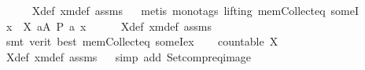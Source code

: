 \begin{isabellebody}
\ \ \ \ \isamarkupfalse%
\ X{\isacharunderscore}{\kern0pt}def\ xm{\isacharunderscore}{\kern0pt}def\ assms{\isacharparenleft}{\kern0pt}{}{\isacharparenright}{\kern0pt}%
\endisatagvisible
{\isafoldvisible}%
%
\isadelimvisible
%
\endisadelimvisible
%
\isadelimproof
\ %
\endisadelimproof
%
\isatagproof
{}\isamarkupfalse%
\ {\isacharparenleft}{\kern0pt}metis\ {\isacharparenleft}{\kern0pt}mono{\isacharunderscore}{\kern0pt}tags{\isacharcomma}{\kern0pt}\ lifting{\isacharparenright}{\kern0pt}\ mem{\isacharunderscore}{\kern0pt}Collect{\isacharunderscore}{\kern0pt}eq\ someI{\isacharparenright}{\kern0pt}%
\endisatagproof
{\isafoldproof}%
%
\isadelimproof
%
\endisadelimproof
\isanewline
%
\isadelimvisible
\ \ %
\endisadelimvisible
%
\isatagvisible
{}\isamarkupfalse%
\ {\isacartoucheopen}{\isasymforall}x\ {\isasymin}\ X{\isachardot}{\kern0pt}\ {\isasymexists}a{\isasymin}A{\isachardot}{\kern0pt}\ P\ a\ x{\isacartoucheclose}\isanewline
\ \ \ \ \isamarkupfalse%
\ X{\isacharunderscore}{\kern0pt}def\ xm{\isacharunderscore}{\kern0pt}def\ assms{\isacharparenleft}{\kern0pt}{}{\isacharparenright}{\kern0pt}%
\endisatagvisible
{\isafoldvisible}%
%
\isadelimvisible
%
\endisadelimvisible
%
\isadelimproof
\ %
\endisadelimproof
%
\isatagproof
{}\isamarkupfalse%
\ {\isacharparenleft}{\kern0pt}smt\ {\isacharparenleft}{\kern0pt}verit{\isacharcomma}{\kern0pt}\ best{\isacharparenright}{\kern0pt}\ mem{\isacharunderscore}{\kern0pt}Collect{\isacharunderscore}{\kern0pt}eq\ someI{\isacharunderscore}{\kern0pt}ex{\isacharparenright}{\kern0pt}%
\endisatagproof
{\isafoldproof}%
%
\isadelimproof
%
\endisadelimproof
\isanewline
%
\isadelimvisible
\ \ %
\endisadelimvisible
%
\isatagvisible
{}\isamarkupfalse%
\ {\isacartoucheopen}countable\ X{\isacartoucheclose}\ \isanewline
\ \ \ \ \isamarkupfalse%
\ X{\isacharunderscore}{\kern0pt}def\ xm{\isacharunderscore}{\kern0pt}def\ assms{\isacharparenleft}{\kern0pt}{}{\isacharparenright}{\kern0pt}%
\endisatagvisible
{\isafoldvisible}%
%
\isadelimvisible
%
\endisadelimvisible
%
\isadelimproof
\ %
\endisadelimproof
%
\isatagproof
{}\isamarkupfalse%
\ {\isacharparenleft}{\kern0pt}simp\ add{\isacharcolon}{\kern0pt}\ Setcompr{\isacharunderscore}{\kern0pt}eq{\isacharunderscore}{\kern0pt}image{\isacharparenright}{\kern0pt}%
\endisatagproof
{\isafoldproof}%
%
\isadelimproof
%
\endisadelimproof
\isanewline
%
\isadelimvisible
%
\endisadelimvisible
%
\isatagvisible
{}\isamarkupfalse%
%
\endisatagvisible

\end{isabellebody}
